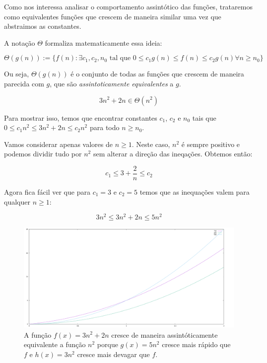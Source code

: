 Como nos interessa analisar o comportamento assintótico das funções, trataremos como equivalentes funções que crescem de maneira similar uma vez que abstraimos as constantes.

A notação $\Theta$ formaliza matematicamente essa ideia:

\begin{displaymath}
  \Theta(g(n)) := \{ f(n) : \exists c_1, c_2, n_0 \textrm{ tal que } 0 \leq c_1 g(n) \leq f(n) \leq c_2 g(n) \forall n \geq n_0 \}
\end{displaymath}

Ou seja, $\Theta(g(n))$ é o conjunto de todas as funções que crescem de maneira parecida com $g$, que são {\em assintoticamente equivalentes} a $g$.

\begin{example}
  \begin{displaymath}
    3  n^2 + 2 n \in \Theta(n^2) 
  \end{displaymath}

  Para mostrar isso, temos que encontrar constantes $c_1$, $c_2$ e $n_0$ tais que $0 \leq c_1 n^2 \leq 3 n^2 + 2 n \leq c_2 n^2$ para todo $n \geq n_0$.

  Vamos considerar apenas valores de $n \geq 1$.
  Neste caso, $n^2$ é sempre positivo e podemos dividir tudo por $n^2$ sem alterar a direção das ineqações.
  Obtemos então:

  \begin{displaymath}
   c_1 \leq 3 + \frac{2}{n} \leq c_2
  \end{displaymath}

  Agora fica fácil ver que para $c_1 = 3$ e $c_2 = 5$ temos que as inequações valem para qualquer $n \geq 1$:

  \begin{displaymath}
   3 n^2 \leq 3 n^2 + 2n \leq 5 n^2
  \end{displaymath}

  \begin{figure}
\includegraphics[width=\textwidth]{imagens/grafico5.png}
\caption{A função $f(x) = 3n^2 + 2n$ cresce de maneira assintóticamente equivalente a função $n^2$ porque $g(x) = 5n^2$ cresce mais rápido que $f$ e $h(x) = 3n^2$ cresce mais devagar que $f$.}
\end{figure}
\end{example}

